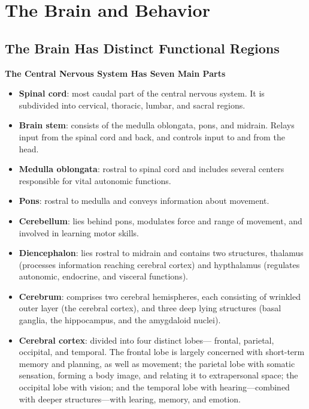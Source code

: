 \documentclass[12pt,a4paper]{article}
\begin{document}
\tableofcontents
\cleardoublepage
\fancyhead{}

\clearpage
\section{The Brain and Behavior}

\subsection{The Brain Has Distinct Functional Regions}

    \textbf{The Central Nervous System Has Seven Main Parts}
    \begin{itemize}
        \item \textbf{Spinal cord}: most caudal part of the central nervous system. It is subdivided into cervical, thoracic, lumbar, and sacral regions.
        \item \textbf{Brain stem}: consists of the medulla oblongata, pons, and midrain. Relays input from the spinal cord and back, and controls input to and from the head.
        \item \textbf{Medulla oblongata}: rostral to spinal cord and includes several centers responsible for vital autonomic functions. 
        \item \textbf{Pons}: rostral to medulla and conveys information about movement.
        \item \textbf{Cerebellum}: lies behind pons, modulates force and range of movement, and involved in learning motor skills.
        \item \textbf{Diencephalon}: lies rostral to midrain and contains two structures, thalamus (processes information reaching cerebral cortex) and hypthalamus (regulates autonomic, endocrine, and visceral functions).
        \item \textbf{Cerebrum}: comprises two cerebral hemispheres, each consisting of wrinkled outer layer (the cerebral cortex), and three deep lying structures (basal ganglia, the hippocampus, and the amygdaloid nuclei).
        \item \textbf{Cerebral cortex}: divided into four distinct lobes--- frontal, parietal, occipital, and temporal. The frontal lobe is largely concerned with short-term memory and planning, as well as movement; the parietal lobe with somatic sensation, forming a body image, and relating it to extrapersonal space; the occipital lobe with vision; and the temporal lobe with hearing---combined with deeper structures---with learing, memory, and emotion.
    \end{itemize}
\end{document}
